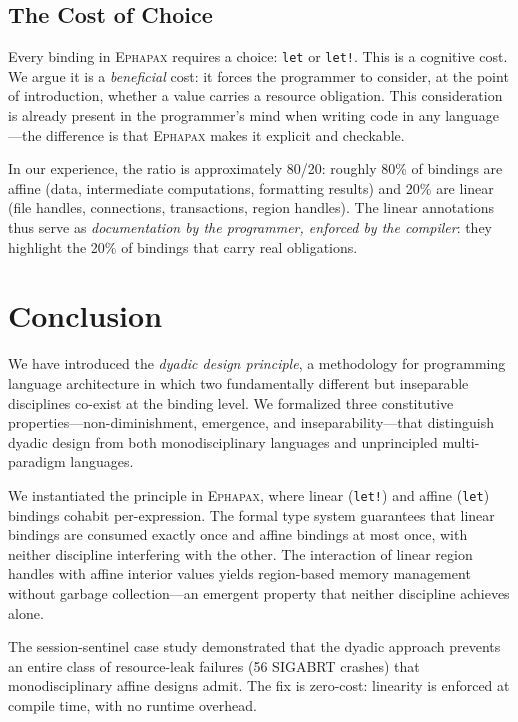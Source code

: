 \documentclass[11pt,a4paper]{article}
\newcommand{\Ephapax}{\textsc{Ephapax}}
\begin{document}
\subsection{The Cost of Choice}

Every binding in \Ephapax{} requires a choice: \lstinline{let} or
\lstinline{let!}. This is a cognitive cost. We argue it is a \emph{beneficial}
cost: it forces the programmer to consider, at the point of introduction,
whether a value carries a resource obligation. This consideration is already
present in the programmer's mind when writing code in any language---the
difference is that \Ephapax{} makes it explicit and checkable.

In our experience, the ratio is approximately 80/20: roughly 80\% of bindings
are affine (data, intermediate computations, formatting results) and 20\% are
linear (file handles, connections, transactions, region handles). The linear
annotations thus serve as \emph{documentation by the programmer, enforced by
the compiler}: they highlight the 20\% of bindings that carry real obligations.

\section{Conclusion}
\label{sec:conclusion}

We have introduced the \emph{dyadic design principle}, a methodology for
programming language architecture in which two fundamentally different but
inseparable disciplines co-exist at the binding level. We formalized three
constitutive properties---non-diminishment, emergence, and inseparability---that
distinguish dyadic design from both monodisciplinary languages and unprincipled
multi-paradigm languages.

We instantiated the principle in \Ephapax{}, where linear (\lstinline{let!})
and affine (\lstinline{let}) bindings cohabit per-expression. The formal type
system guarantees that linear bindings are consumed exactly once and affine
bindings at most once, with neither discipline interfering with the other. The
interaction of linear region handles with affine interior values yields
region-based memory management without garbage collection---an emergent property
that neither discipline achieves alone.

The session-sentinel case study demonstrated that the dyadic approach prevents
an entire class of resource-leak failures (56 SIGABRT crashes) that
monodisciplinary affine designs admit. The fix is zero-cost: linearity is
enforced at compile time, with no runtime overhead.
\end{document}
